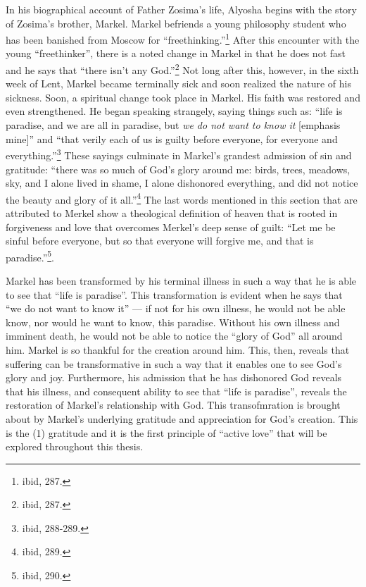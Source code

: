         In his biographical account of Father Zosima's life, Alyosha begins with the story of Zosima's brother, Markel. Markel befriends a young philosophy student who has been banished from Moscow for ``freethinking.''\footnote{ibid, 287.} After this encounter with the young ``freethinker'', there is a noted change in Markel in that he does not fast and he says that ``there isn't any God.''\footnote{ibid, 287.} Not long after this, however, in the sixth week of Lent, Markel became terminally sick and soon realized the nature of his sickness. Soon, a spiritual change took place in Markel. His faith was restored and even strengthened. He began speaking strangely, saying things such as: ``life is paradise, and we are all in paradise, but \emph{we do not want to know it} [emphasis mine]'' and ``that verily each of us is guilty before everyone, for everyone and everything.''\footnote{ibid, 288-289.} These sayings culminate in Markel's grandest admission of sin and gratitude: ``there was so much of God's glory around me: birds, trees, meadows, sky, and I alone lived in shame, I alone dishonored everything, and did not notice the beauty and glory of it all.''\footnote{ibid, 289.} The last words mentioned in this section that are attributed to Merkel show a theological definition of heaven that is rooted in forgiveness and love that overcomes Merkel's deep sense of guilt: ``Let me be sinful before everyone, but so that everyone will forgive me, and that is paradise.''\footnote{ibid, 290.}.
        
        Markel has been transformed by his terminal illness in such a way that he is able to see that ``life is paradise''. This transformation is evident when he says that ``we do not want to know it'' --- if not for his own illness, he would not be able know, nor would he want to know, this paradise. Without his own illness and imminent death, he would not be able to notice the ``glory of God'' all around him. Markel is so thankful for the creation around him. This, then, reveals that suffering can be transformative in such a way that it enables one to see God's glory and joy. Furthermore, his admission that he has dishonored God reveals that his illness, and consequent ability to see that ``life is paradise'', reveals the restoration of Markel's relationship with God. This transofmration is brought about by Markel's underlying gratitude and appreciation for God's creation. This is the (1) gratitude and it is the first principle of ``active love'' that will be explored throughout this thesis.


